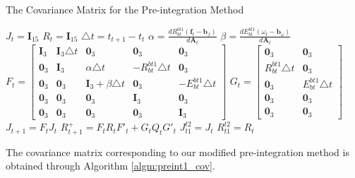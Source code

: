 \documentclass[12pt]{article}   %
\begin{document}
\begin{algorithm}
\caption{The Covariance Matrix for the Pre-integration Method}
\label{algm:preint_cov}
\begin{algorithmic}%
\STATE $J_t = \textbf{I}_{15}$ 
\STATE $R_t = \textbf{I}_{15}$ 
\STATE $\triangle t =  t_{t+1} - t_t$ 
\STATE $\alpha = \frac{d R^{bt1}_{bt} (\textbf{f}_t - \textbf{b}_f)}{d \textbf{A}_t}$
\STATE $\beta = \frac{d E^{bt1}_{bt} (\omega_t - \textbf{b}_\omega)}{d \textbf{A}_t}$
\STATE $F_t = \begin{bmatrix} \textbf{I}_3 & \textbf{I}_3 \triangle t & \textbf{0}_3 & \textbf{0}_3 & \textbf{0}_3 \\ \textbf{0}_3 & \textbf{I}_3  & \alpha \triangle t & -R^{bt1}_{bt} \triangle t & \textbf{0}_3 \\ \textbf{0}_3 & \textbf{0}_3 & \textbf{I}_3 + \beta \triangle t & \textbf{0}_3 & -E^{bt1}_{bt} \triangle t \\ \textbf{0}_3 & \textbf{0}_3 & \textbf{0}_3 & \textbf{I}_3 & \textbf{0}_3 \\ \textbf{0}_3 & \textbf{0}_3 & \textbf{0}_3 & \textbf{0}_3 & \textbf{I}_3\end{bmatrix}$
\STATE $G_t = \begin{bmatrix} \textbf{0}_3 & \textbf{0}_3 \\ R^{bt1}_{bt} \triangle t & \textbf{0}_3 \\ \textbf{0}_3 & E^{bt1}_{bt} \triangle t \\ \textbf{0}_3 & \textbf{0}_3 \\ \textbf{0}_3 & \textbf{0}_3 \end{bmatrix}$
\STATE $J_{t+1} = F_{t} J_t$ 
\STATE $R_{t+1}^+ = F_{t} R_t F'_{t} + G_t Q_t G'_t$ 
\ENDFOR
\STATE $J^{t2}_{t1} = J_{t}$
\STATE $R^{t2}_{t1} = R_{t}$
\end{algorithmic}
\end{algorithm}

The covariance matrix corresponding to our modified pre-integration method is obtained through Algorithm \ref{algm:preint1_cov}.
\end{document}
